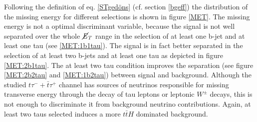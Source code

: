 %
Following the definition of eq. \ref{STgedöns} (cf. section \ref{bgeff}) the distribution of the missing energy for different selections is shown in figure \ref{MET}. The missing energy is not a optimal discriminant variable, because the signal is not well separated over the whole $\cancel{E}_T$ range in the selection of at least one b-jet and at least one tau (see \ref{MET:1b1tau}). The signal is in fact better separated in the selection of at least two b-jets and at least one tau as depicted in figure \ref{MET:2b1tau}. The at least two tau condition improves the separation (see figure \ref{MET:2b2tau} and \ref{MET:1b2tau}) between signal and background. Although the studied $t\tau^{-}+\bar{t}\tau^{+}$ channel has sources of neutrinos responsible for missing transverse energy through the decay of tau leptons or leptonic $W^\pm$ decays, this is not enough to discriminate it from background neutrino contributions. Again, at least two taus selected induces a more $t\bar{t}H$ dominated background. \par   
%

